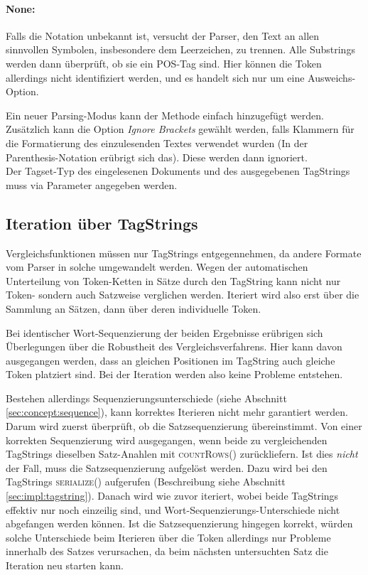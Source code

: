 \paragraph{None:} Falls die Notation unbekannt ist, versucht der Parser, den Text an allen sinnvollen Symbolen, insbesondere dem Leerzeichen, zu trennen. Alle Substrings werden dann überprüft, ob sie ein POS-Tag sind. Hier können die Token allerdings nicht identifiziert werden, und es handelt sich nur um eine Ausweichs-Option. 

Ein neuer Parsing-Modus kann der Methode einfach hinzugefügt werden. Zusätzlich kann die Option \textit{\glqq Ignore Brackets\grqq{}} gewählt werden, falls Klammern für die Formatierung des einzulesenden Textes verwendet wurden (In der Parenthesis-Notation erübrigt sich das). Diese werden dann ignoriert.
\\
Der Tagset-Typ des eingelesenen Dokuments und des ausgegebenen TagStrings muss via Parameter angegeben werden.

\subsection{Iteration über TagStrings}
\label{sec:impl:eval:comparison}

Vergleichsfunktionen müssen nur TagStrings entgegennehmen, da andere Formate vom Parser in solche umgewandelt werden. Wegen der automatischen Unterteilung von Token-Ketten in Sätze durch den TagString kann nicht nur Token- sondern auch Satzweise verglichen werden. Iteriert wird also erst über die Sammlung an Sätzen, dann über deren individuelle Token.

Bei identischer Wort-Sequenzierung der beiden Ergebnisse erübrigen sich Überlegungen über die Robustheit des Vergleichsverfahrens. Hier kann davon ausgegangen werden, dass an gleichen Positionen im TagString auch gleiche Token platziert sind. Bei der Iteration werden also keine Probleme entstehen.

Bestehen allerdings Sequenzierungsunterschiede (siehe Abschnitt \ref{sec:concept:sequence}), kann korrektes Iterieren nicht mehr garantiert werden. Darum wird zuerst überprüft, ob die Satzsequenzierung übereinstimmt. Von einer korrekten Sequenzierung wird ausgegangen, wenn beide zu vergleichenden TagStrings dieselben Satz-Anahlen mit \textsc{countRows()} zurückliefern. Ist dies \textit{nicht} der Fall, muss die Satzsequenzierung aufgelöst werden. Dazu wird bei den TagStrings \textsc{serialize()} aufgerufen (Beschreibung siehe Abschnitt \ref{sec:impl:tagstring}). Danach wird wie zuvor iteriert, wobei beide TagStrings effektiv nur noch einzeilig sind, und Wort-Sequenzierungs-Unterschiede nicht abgefangen werden können. Ist die Satzsequenzierung hingegen korrekt, würden solche Unterschiede beim Iterieren über die Token allerdings nur Probleme innerhalb des Satzes verursachen, da beim nächsten untersuchten Satz die Iteration neu starten kann.

